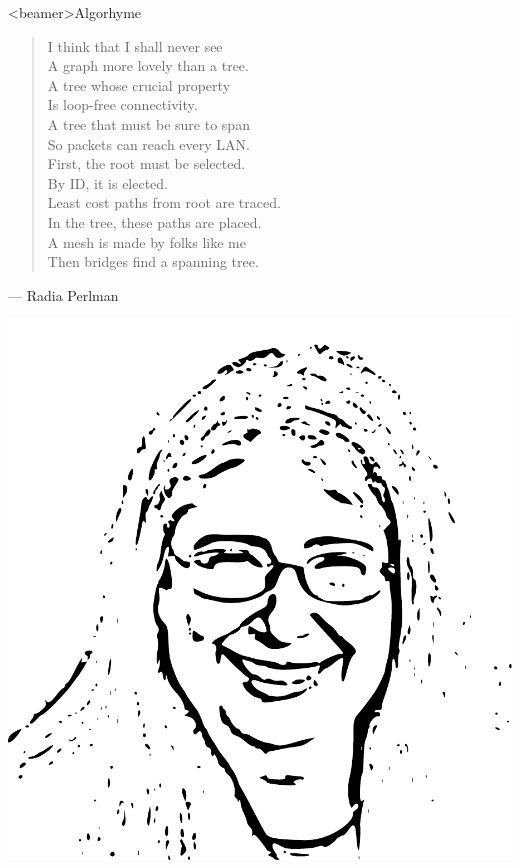 \begin{frame}<beamer>{Algorhyme}
  \begin{minipage}{.68\linewidth}
    \begin{verse}
      I think that I shall never see\\
      A graph more lovely than a tree.\\[1ex]
      A tree whose crucial property\\
      Is loop-free connectivity.\\[1ex]
      A tree that must be sure to span\\
      So packets can reach every LAN.\\[1ex]
      First, the root must be selected.\\
      By ID, it is elected.\\[1ex]
      Least cost paths from root are traced.\\
      In the tree, these paths are placed.\\[1ex]
      A mesh is made by folks like me\\
      Then bridges find a spanning tree.\\[1ex]
    \end{verse}
    \begin{flushright}{\footnotesize --- Radia Perlman\hspace{3em}}\end{flushright}    
  \end{minipage}
  \begin{minipage}{.3\linewidth}
    \includegraphics[width=\textwidth]{radia}
  \end{minipage}
\end{frame}

